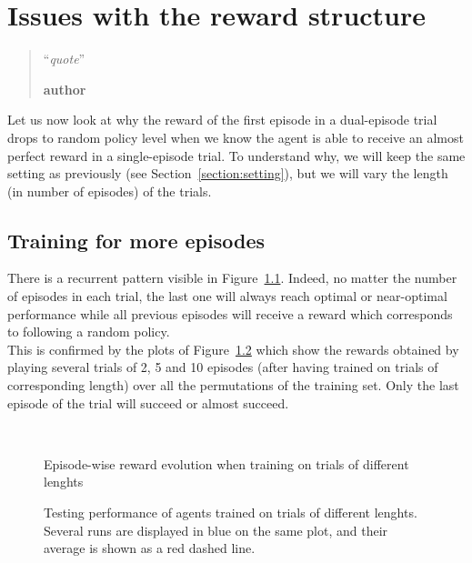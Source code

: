 \chapter{Issues with the reward structure}
\label{chap:reward_structure}
\begin{quotation}
\noindent ``\emph{quote}''
\begin{flushright}\textbf{author}\end{flushright}
\end{quotation}

Let us now look at why the reward of the first episode in a dual-episode
trial drops to random policy level when we know the agent is able to receive
an almost perfect reward in a single-episode trial. To understand why, we will
keep the same setting as previously (see Section~\ref{section:setting}), but
we will vary the length (in number of episodes) of the trials.

\section{Training for more episodes}
There is a recurrent pattern visible in Figure~\ref{fig:20permsLR_training}.
Indeed, no matter the number of episodes in each trial, the last one will
always reach optimal or near-optimal performance while all previous episodes
will receive a reward which corresponds to following a random policy.\\

This is confirmed by the plots of Figure~\ref{fig:20permsLR_rewards} which
show the rewards obtained by playing several trials of 2, 5 and 10 episodes
(after having trained on trials of corresponding length) over all the
permutations of the training set. Only the last episode of the trial will
succeed or almost succeed.

\begin{figure}
	\centering
	\\
	\caption{Episode-wise reward evolution when training on trials of 
	different lenghts}
	\label{fig:20permsLR_training}
\end{figure}

\begin{figure}
	\centering
	\caption{Testing performance of agents trained on trials of different
	lenghts. Several runs are displayed in blue on the same plot, and their
	average is shown as a red dashed line.}
	\label{fig:20permsLR_rewards}
\end{figure}

